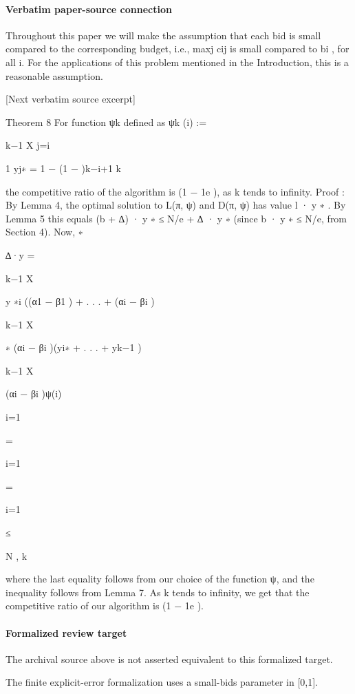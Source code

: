 \documentclass[10pt]{article}
\begin{document}
\paragraph{Verbatim paper-source connection}
\begin{ReviewVerbatim}
Throughout this paper we will make the assumption that each bid is small compared to the
corresponding budget, i.e., maxj cij is small compared to bi , for all i. For the applications of
this problem mentioned in the Introduction, this is a reasonable assumption.

[Next verbatim source excerpt]

Theorem 8 For function ψk defined as
ψk (i) :=

k−1
X
j=i

1
yj∗ = 1 − (1 − )k−i+1
k

the competitive ratio of the algorithm is (1 − 1e ), as k tends to infinity.
Proof :
By Lemma 4, the optimal solution to L(π, ψ) and D(π, ψ) has value l · y ∗ . By
Lemma 5 this equals (b + ∆) · y ∗ ≤ N/e + ∆ · y ∗ (since b · y ∗ ≤ N/e, from Section 4).
Now,
∗

∆·y =

k−1
X

y ∗i ((α1 − β1 ) + . . . + (αi − βi )

k−1
X

∗
(αi − βi )(yi∗ + . . . + yk−1
)

k−1
X

(αi − βi )ψ(i)

i=1

=

i=1

=

i=1

≤

N
,
k

where the last equality follows from our choice of the function ψ, and the inequality follows
from Lemma 7. As k tends to infinity, we get that the competitive ratio of our algorithm is
(1 − 1e ).
\end{ReviewVerbatim}


\paragraph{Formalized review target}
The archival source above is not asserted equivalent to this formalized target.
\begin{ReviewVerbatim}
The finite explicit-error formalization uses a small-bids parameter in [0,1].
\end{ReviewVerbatim}
\end{document}
